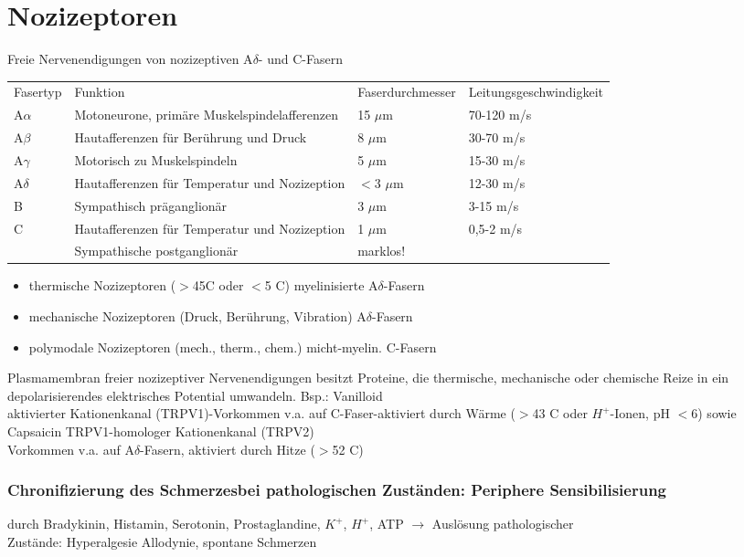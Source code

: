 \documentclass[10pt,a4paper]{report}
\begin{document}
\section{Nozizeptoren} %
\label{sec:nozizeptoren}
Freie Nervenendigungen von nozizeptiven A$\delta$- und C-Fasern\\
\begin{tabularx}{\textwidth}{XXXX}
Fasertyp&Funktion&Faserdurchmesser&Leitungsgeschwindigkeit\\
A$\alpha$&Motoneurone, primäre Muskelspindelafferenzen&15 $\mu$m&70-120 m/s\\
A$\beta$&Hautafferenzen für Berührung und Druck&8 $\mu$m&30-70 m/s\\
A$\gamma$&Motorisch zu Muskelspindeln&5 $\mu$m&15-30 m/s\\
A$\delta$&Hautafferenzen für Temperatur und Nozizeption&$<$3 $\mu$m&12-30 m/s\\
B&Sympathisch präganglionär&3 $\mu$m&3-15 m/s\\
C&Hautafferenzen für Temperatur und Nozizeption&1 $\mu$m&0,5-2 m/s\\
&Sympathische postganglionär&marklos!&\\
\end{tabularx}
\begin{itemize}
	\item thermische Nozizeptoren ($>$45\degree C oder $<$5 \degree C) myelinisierte A$\delta$-Fasern
	\item mechanische Nozizeptoren (Druck, Berührung, Vibration) A$\delta$-Fasern
	\item polymodale Nozizeptoren (mech., therm., chem.) micht-myelin. C-Fasern
\end{itemize}
Plasmamembran freier nozizeptiver Nervenendigungen besitzt Proteine, die thermische, mechanische oder chemische Reize in ein depolarisierendes elektrisches Potential umwandeln.
Bsp.: Vanilloid\\
aktivierter Kationenkanal (TRPV1)-Vorkommen v.a. auf C-Faser-aktiviert durch Wärme ($>$43 \degree C oder $H^+$-Ionen, pH $<$6) sowie Capsaicin TRPV1-homologer Kationenkanal (TRPV2)\\
Vorkommen v.a. auf A$\delta$-Fasern, aktiviert durch Hitze ($>$52 \degree C)
\subsubsection{Chronifizierung des Schmerzesbei pathologischen Zuständen: Periphere Sensibilisierung } %
\label{par:chronifizierung_des_schmerzesbei_pathologischen_zust_nden_periphere_sensibilisierung_}
durch Bradykinin, Histamin, Serotonin, Prostaglandine, $K^+$, $H^+$, ATP $\rightarrow$ Auslösung pathologischer \\
Zustände: Hyperalgesie Allodynie, spontane Schmerzen
\end{document}
